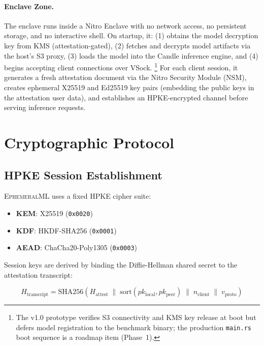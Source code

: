 \documentclass[11pt,a4paper]{article}
\begin{document}
\paragraph{Enclave Zone.}
The enclave runs inside a Nitro Enclave with no network access, no persistent storage, and no interactive shell.
On startup, it:
(1) obtains the model decryption key from KMS (attestation-gated),
(2) fetches and decrypts model artifacts via the host's S3 proxy,
(3) loads the model into the Candle inference engine, and
(4) begins accepting client connections over VSock.%
\footnote{The v1.0 prototype verifies S3 connectivity and KMS key release at boot but defers model registration to the benchmark binary; the production \texttt{main.rs} boot sequence is a roadmap item (Phase~1).}
For each client session, it generates a fresh attestation document via the Nitro Security Module (NSM), creates ephemeral X25519 and Ed25519 key pairs (embedding the public keys in the attestation user data), and establishes an HPKE-encrypted channel before serving inference requests.

\section{Cryptographic Protocol}
\label{sec:protocol}

\subsection{HPKE Session Establishment}

\textsc{EphemeralML} uses a fixed HPKE cipher suite:
\begin{itemize}
  \item \textbf{KEM}: X25519 (\texttt{0x0020})
  \item \textbf{KDF}: HKDF-SHA256 (\texttt{0x0001})
  \item \textbf{AEAD}: ChaCha20-Poly1305 (\texttt{0x0003})
\end{itemize}

Session keys are derived by binding the Diffie-Hellman shared secret to the attestation transcript:

\begin{equation}
\label{eq:transcript}
H_{\mathrm{transcript}} = \mathrm{SHA256}\!\left(
  H_{\mathrm{attest}} \;\|\;
  \mathrm{sort}(pk_{\mathrm{local}}, pk_{\mathrm{peer}}) \;\|\;
  n_{\mathrm{client}} \;\|\;
  v_{\mathrm{proto}}
\right)
\end{equation}
\end{document}
